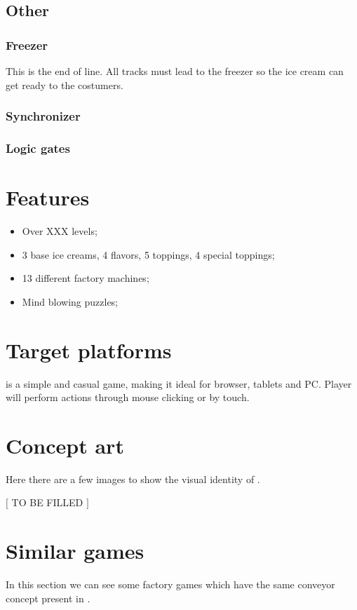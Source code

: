 \documentclass[a4paper]{scrartcl}
\begin{document}
    \subsection{Other}
        \subsubsection{Freezer}
            This is the end of line. All tracks must lead to the freezer so the
            ice cream can get ready to the costumers.

        \subsubsection{Synchronizer}

        \subsubsection{Logic gates}

\section{Features}
    \begin{itemize}
        \item Over XXX levels;
        \item 3 base ice creams, 4 flavors, 5 toppings, 4 special toppings;
        \item 13 different factory machines;
        \item Mind blowing puzzles;
    \end{itemize}

\section{Target platforms}
    \gamename is a simple and casual game, making it ideal for browser, tablets
    and PC. Player will perform actions through mouse clicking or by touch.

\section{Concept art}
    Here there are a few images to show the visual identity of \gamename.

    \centering
    $[$ TO BE FILLED $]$

\section{Similar games}
    In this section we can see some factory games which have the same conveyor
    concept present in \gamename.
\end{document}
